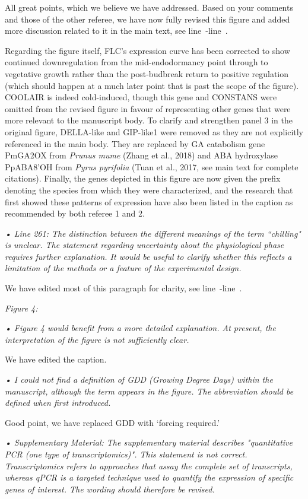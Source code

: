 \documentclass[11pt]{article}
\newcommand{\lr}[1]{line~\lineref{#1}}
\begin{document}
All great points, which we believe we have addressed. Based on your comments and those of the other referee, we have now fully revised this figure and added more discussion related to it in the main text, see \lr{r2momolS}-\lr{r2momolE}. 

Regarding the figure itself, FLC's expression curve has been corrected to show continued downregulation from the mid-endodormancy point through to vegetative growth rather than the post-budbreak return to positive regulation (which should happen at a much later point that is past the scope of the figure). COOLAIR is indeed cold-induced, though this gene and CONSTANS were omitted from the revised figure in favour of representing other genes that were more relevant to the manuscript body. To clarify and strengthen panel 3 in the original figure, DELLA-like and GIP-like1 were removed as they are not explicitly referenced in the main body. They are replaced by GA catabolism gene PmGA2OX from \emph{Prunus mume} (Zhang et al., 2018) and ABA hydroxylase PpABA8'OH from \emph{Pyrus pyrifolia} (Tuan et al., 2017, see main text for complete citations). Finally, the genes depicted in this figure are now given the prefix denoting the species from which they were characterized, and the research that first showed these patterns of expression have also been listed in the caption as recommended by both referee 1 and 2.

\emph{•	Line 261: The distinction between the different meanings of the term ``chilling" is unclear. The statement regarding uncertainty about the physiological phase requires further explanation. It would be useful to clarify whether this reflects a limitation of the methods or a feature of the experimental design.}

We have edited most of this paragraph for clarity, see \lr{r1huhS}-\lr{r1huhE}.

\emph{Figure 4:} 

\emph{  •	Figure 4 would benefit from a more detailed explanation. At present, the interpretation of the figure is not sufficiently clear.}

We have edited the caption. 
  
\emph{  •	I could not find a definition of GDD (Growing Degree Days) within the manuscript, although the term appears in the figure. The abbreviation should be defined when first introduced.}

Good point, we have replaced GDD with `forcing required.'
  
\emph{•	Supplementary Material: The supplementary material describes "quantitative PCR (one type of transcriptomics)". This statement is not correct. Transcriptomics refers to approaches that assay the complete set of transcripts, whereas qPCR is a targeted technique used to quantify the expression of specific genes of interest. The wording should therefore be revised.}
\end{document}
